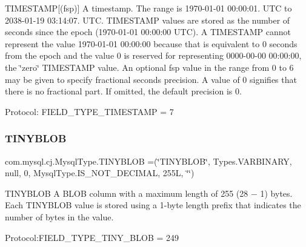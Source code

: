 T\+I\+M\+E\+S\+T\+A\+MP\mbox{[}(fsp)\mbox{]} A timestamp. The range is \textquotesingle{}1970-\/01-\/01 00\+:00\+:01.\textquotesingle{} U\+TC to \textquotesingle{}2038-\/01-\/19 03\+:14\+:07.\textquotesingle{} U\+TC. T\+I\+M\+E\+S\+T\+A\+MP values are stored as the number of seconds since the epoch (\textquotesingle{}1970-\/01-\/01 00\+:00\+:00\textquotesingle{} U\+TC). A T\+I\+M\+E\+S\+T\+A\+MP cannot represent the value \textquotesingle{}1970-\/01-\/01 00\+:00\+:00\textquotesingle{} because that is equivalent to 0 seconds from the epoch and the value 0 is reserved for representing \textquotesingle{}0000-\/00-\/00 00\+:00\+:00\textquotesingle{}, the \char`\"{}zero\char`\"{} T\+I\+M\+E\+S\+T\+A\+MP value. An optional fsp value in the range from 0 to 6 may be given to specify fractional seconds precision. A value of 0 signifies that there is no fractional part. If omitted, the default precision is 0.

Protocol\+: F\+I\+E\+L\+D\+\_\+\+T\+Y\+P\+E\+\_\+\+T\+I\+M\+E\+S\+T\+A\+MP = 7 \mbox{\label{enumcom_1_1mysql_1_1cj_1_1_mysql_type_a55c5e7d63a690905687b7fa55342dd9c}} 
\subsubsection{\texorpdfstring{T\+I\+N\+Y\+B\+L\+OB}{TINYBLOB}}
{\footnotesize\ttfamily com.\+mysql.\+cj.\+Mysql\+Type.\+T\+I\+N\+Y\+B\+L\+OB =(\char`\"{}T\+I\+N\+Y\+B\+L\+OB\char`\"{}, Types.\+V\+A\+R\+B\+I\+N\+A\+RY, null, 0, Mysql\+Type.\+I\+S\+\_\+\+N\+O\+T\+\_\+\+D\+E\+C\+I\+M\+AL, 255\+L, \char`\"{}\char`\"{})}

T\+I\+N\+Y\+B\+L\+OB A B\+L\+OB column with a maximum length of 255 (28 − 1) bytes. Each T\+I\+N\+Y\+B\+L\+OB value is stored using a 1-\/byte length prefix that indicates the number of bytes in the value.

Protocol\+:F\+I\+E\+L\+D\+\_\+\+T\+Y\+P\+E\+\_\+\+T\+I\+N\+Y\+\_\+\+B\+L\+OB = 249 \mbox{\label{enumcom_1_1mysql_1_1cj_1_1_mysql_type_a87adada40b706dcea9427e4cf5294ed8}} 
